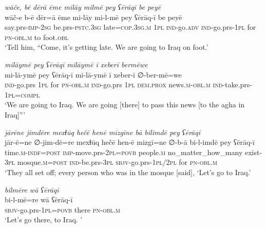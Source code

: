 \ea \label{BP.78}
\textit{wāče, bē dērā ēme milāy milmē pey ʕērāqī be peyē} \\ 
\gll wāč-e b-ē dēr=ā ēme mi-lāy mi-l-mē pey ʕērāq-ī be peyē \\ 
 say.prs-\textsc{imp-}\textsc{2sg} be.prs\textsc{-pstc}\textsc{.3sg} late\textsc{=cop}\textsc{.3sg}\textsc{.m} \textsc{1pl} \textsc{ind-}go\textsc{.adv} \textsc{ind-}go.prs\textsc{-\textsc{1pl}} for \textsc{pn}\textsc{-obl}\textsc{.m} to foot\textsc{.obl} \\ 
\glt `Tell him, “Come, it’s getting late. We are going to Iraq on foot.'
\z 
 
\ea \label{BP.79}
\textit{milāymē pey ʕērāqī milāymē ī xeberī bermēwe} \\ 
\gll mi-lā-ymē pey ʕērāq-ī mi-lā-ymē ī xeber-ī ∅-ber-mē=we \\ 
 \textsc{ind-}go.prs \textsc{1pl} for \textsc{pn}\textsc{-obl}\textsc{.m} \textsc{ind-}go.prs \textsc{1pl} \textsc{dem.prox} news\textsc{.m}\textsc{-obl}\textsc{.m} \textsc{ind-}take.prs\textsc{-\textsc{1pl}}\textsc{=compl} \\ 
\glt `We are going to Iraq. We are going [there] to pass this news [to the agha in Iraq]”'
\z 
 
\ea \label{BP.87}
\textit{jārēne jimdēre mexɫūq hečē henē mizgīne bā bilimdē pey ʕērāqī} \\ 
\gll jār-ē=ne ∅-jim-dē=re mexɫūq hečē hen-ē mizgī=ne ∅-b-ā bi-l-imdē pey ʕērāq-ī \\ 
 time\textsc{.m}\textsc{-indf}\textsc{=\textsc{post}} \textsc{imp-}move.prs-\textsc{2pl}\textsc{=\textsc{povb}} people\textsc{.m} no\_matter\_how\_many exist\textsc{-3pl} mosque\textsc{.m}\textsc{=\textsc{post}} \textsc{ind-}be.prs\textsc{-3pl} \textsc{sbjv-}go.prs\textsc{-\textsc{1pl}}/\textsc{2pl} for \textsc{pn}\textsc{-obl}\textsc{.m} \\ 
\glt `They all set off; every person who was in the mosque [said], ‘Let’s go to Iraq.'
\z 
 
\ea \label{BP.88}
\textit{bilmēre wā ʕērāqī} \\ 
\gll bi-l-mē=re wā ʕērāq-ī \\ 
 \textsc{sbjv-}go.prs\textsc{-\textsc{1pl}}\textsc{=\textsc{povb}} there \textsc{pn}\textsc{-obl}\textsc{.m} \\ 
\glt `Let’s go there, to Iraq. '
\z 
 
